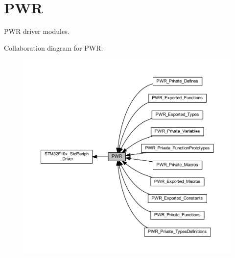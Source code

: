 \hypertarget{group___p_w_r}{}\section{P\+WR}
\label{group___p_w_r}


P\+WR driver modules.  


Collaboration diagram for P\+WR\+:
\nopagebreak
\begin{figure}[H]
\begin{center}
\leavevmode
\includegraphics[width=350pt]{group___p_w_r}
\end{center}
\end{figure}

